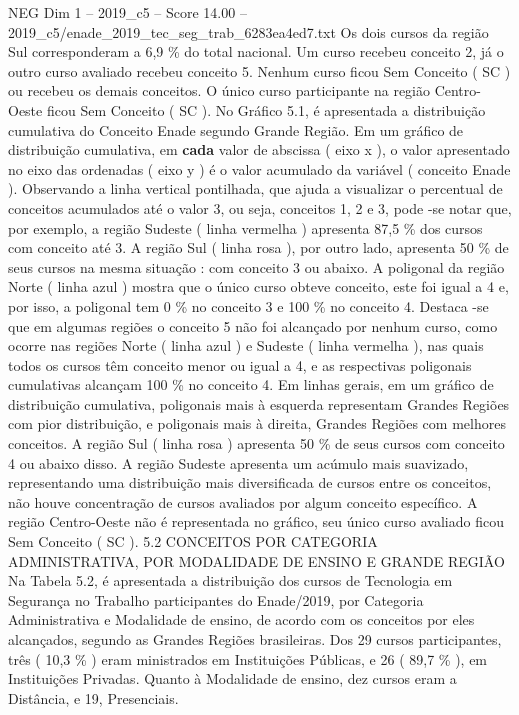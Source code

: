\begin{textsample}{NEG Dim 1 – 2019\_c5 – Score 14.00 – 2019\_c5/enade\_2019\_tec\_seg\_trab\_6283ea4ed7.txt}
Os dois cursos da região Sul corresponderam a 6,9 \% do total nacional.
Um curso recebeu conceito 2, já o outro curso avaliado recebeu conceito 5.
Nenhum curso ficou Sem Conceito ( SC ) ou recebeu os demais conceitos.
O único curso participante na região Centro-Oeste ficou Sem Conceito ( SC ).
No Gráfico 5.1, é apresentada a distribuição cumulativa do Conceito Enade segundo Grande Região.
Em um gráfico de distribuição cumulativa, em \textbf{cada} valor de abscissa ( eixo x ), o valor apresentado no eixo das ordenadas ( eixo y ) é o valor acumulado da variável ( conceito Enade ).
Observando a linha vertical pontilhada, que ajuda a visualizar o percentual de conceitos acumulados até o valor 3, ou seja, conceitos 1, 2 e 3, pode -se notar que, por exemplo, a região Sudeste ( linha vermelha ) apresenta 87,5 \% dos cursos com conceito até 3.
A região Sul ( linha rosa ), por outro lado, apresenta 50 \% de seus cursos na mesma situação : com conceito 3 ou abaixo.
A poligonal da região Norte ( linha azul ) mostra que o único curso obteve conceito, este foi igual a 4 e, por isso, a poligonal tem 0 \% no conceito 3 e 100 \% no conceito 4.
Destaca -se que em algumas regiões o conceito 5 não foi alcançado por nenhum curso, como ocorre nas regiões Norte ( linha azul ) e Sudeste ( linha vermelha ), nas quais todos os cursos têm conceito menor ou igual a 4, e as respectivas poligonais cumulativas alcançam 100 \% no conceito 4.
Em linhas gerais, em um gráfico de distribuição cumulativa, poligonais mais à esquerda representam Grandes Regiões com pior distribuição, e poligonais mais à direita, Grandes Regiões com melhores conceitos.
A região Sul ( linha rosa ) apresenta 50 \% de seus cursos com conceito 4 ou abaixo disso.
A região Sudeste apresenta um acúmulo mais suavizado, representando uma distribuição mais diversificada de cursos entre os conceitos, não houve concentração de cursos avaliados por algum conceito específico.
A região Centro-Oeste não é representada no gráfico, seu único curso avaliado ficou Sem Conceito ( SC ). 5.2 CONCEITOS POR CATEGORIA ADMINISTRATIVA, POR MODALIDADE DE ENSINO E GRANDE REGIÃO Na Tabela 5.2, é apresentada a distribuição dos cursos de Tecnologia em Segurança no Trabalho participantes do Enade/2019, por Categoria Administrativa e Modalidade de ensino, de acordo com os conceitos por eles alcançados, segundo as Grandes Regiões brasileiras.
Dos 29 cursos participantes, três ( 10,3 \% ) eram ministrados em Instituições Públicas, e 26 ( 89,7 \% ), em Instituições Privadas.
Quanto à Modalidade de ensino, dez cursos eram a Distância, e 19, Presenciais.

\end{textsample}
